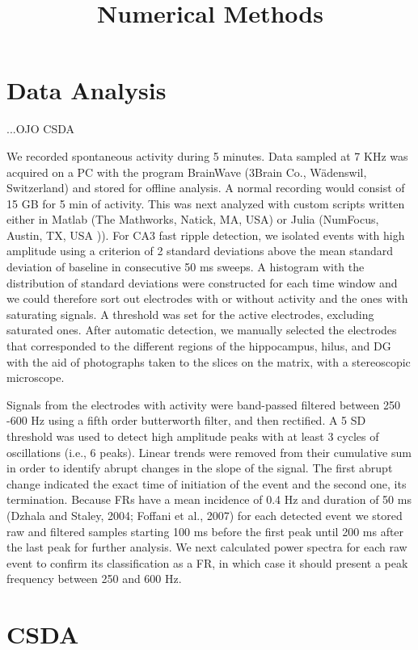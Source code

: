 \documentclass{article}
\title{Numerical Methods}
\begin{document}
\section{Data Analysis}

...OJO CSDA

We recorded spontaneous activity during 5 minutes. Data sampled at 7 KHz was acquired on a PC with the program BrainWave (3Brain Co., Wädenswil, Switzerland) and stored for offline analysis. A normal recording would consist of 15 GB for 5 min of activity. This was next analyzed with custom scripts written either in Matlab (The Mathworks, Natick, MA, USA) or Julia (NumFocus, Austin, TX, USA \cite{Bez2017})). For CA3 fast ripple detection, we isolated events with high amplitude using a criterion of 2 standard deviations above the mean standard deviation of baseline in consecutive 50 ms sweeps. A histogram with the distribution of standard deviations were constructed for each time window and we could therefore sort out electrodes with or without activity and the ones with saturating signals. A threshold was set for the active electrodes, excluding saturated ones. After automatic detection, we manually selected the electrodes that corresponded to the different regions of the hippocampus, hilus, and DG with the aid of photographs taken to the slices on the matrix, with a stereoscopic
microscope.

 Signals from the electrodes with activity were band-passed filtered between 250 -600 Hz using a fifth order butterworth filter, and then rectified. A 5 SD threshold was used to detect high amplitude peaks with at least 3 cycles of oscillations (i.e., 6 peaks). Linear trends were removed from their cumulative sum in order to identify abrupt changes in the slope of the signal. The first abrupt change indicated the exact time of initiation of the event and the second one, its termination. Because FRs have a mean incidence of 0.4 Hz and duration of 50 ms (Dzhala and Staley, 2004; Foffani et al., 2007) for each detected event we stored raw and filtered samples starting 100 ms before the first peak until 200 ms after the last peak for further analysis. We next calculated power spectra for each raw event to confirm its classification as a FR, in which case it should present a peak frequency between 250 and 600 Hz.



\section{CSDA}
            
\end{document}
